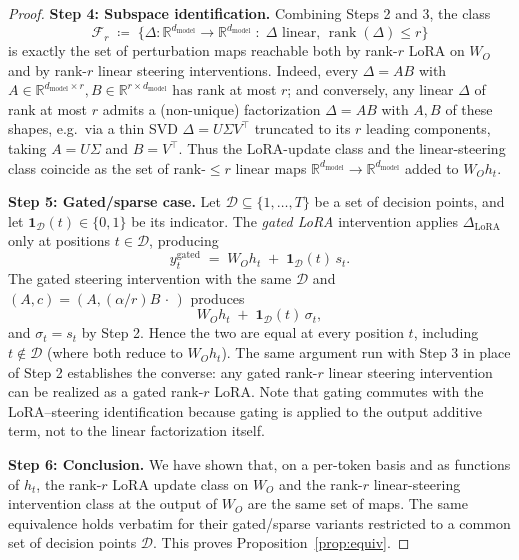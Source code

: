 \documentclass[11pt]{article}
\begin{document}
\begin{proof}
\smallskip

\noindent\textbf{Step 4: Subspace identification.}
Combining Steps 2 and 3, the class
\[
\mathcal{F}_r \;\coloneqq\; \bigl\{ \Delta : \mathbb{R}^{d_{\mathrm{model}}} \to \mathbb{R}^{d_{\mathrm{model}}} \;:\; \Delta \text{ linear, } \operatorname{rank}(\Delta) \le r \bigr\}
\]
is exactly the set of perturbation maps reachable both by rank-$r$ LoRA on $W_O$ and by rank-$r$ linear steering interventions. Indeed, every $\Delta = AB$ with $A \in \mathbb{R}^{d_{\mathrm{model}}\times r}, B \in \mathbb{R}^{r \times d_{\mathrm{model}}}$ has rank at most $r$; and conversely, any linear $\Delta$ of rank at most $r$ admits a (non-unique) factorization $\Delta = AB$ with $A, B$ of these shapes, e.g.\ via a thin SVD $\Delta = U \Sigma V^\top$ truncated to its $r$ leading components, taking $A = U\Sigma$ and $B = V^\top$. Thus the LoRA-update class and the linear-steering class coincide as the set of rank-$\le r$ linear maps $\mathbb{R}^{d_{\mathrm{model}}} \to \mathbb{R}^{d_{\mathrm{model}}}$ added to $W_O h_t$.

\smallskip

\noindent\textbf{Step 5: Gated/sparse case.}
Let $\mathcal{D} \subseteq \{1, \dots, T\}$ be a set of decision points, and let $\mathbf{1}_{\mathcal{D}}(t) \in \{0, 1\}$ be its indicator. The \emph{gated LoRA} intervention applies $\Delta_{\mathrm{LoRA}}$ only at positions $t \in \mathcal{D}$, producing
\[
y_t^{\mathrm{gated}} \;=\; W_O h_t \;+\; \mathbf{1}_{\mathcal{D}}(t)\, s_t.
\]
The gated steering intervention with the same $\mathcal{D}$ and $(A, c) = (A, (\alpha/r) B \,\cdot\,)$ produces
\[
W_O h_t \;+\; \mathbf{1}_{\mathcal{D}}(t)\, \sigma_t,
\]
and $\sigma_t = s_t$ by Step 2. Hence the two are equal at every position $t$, including $t \notin \mathcal{D}$ (where both reduce to $W_O h_t$). The same argument run with Step 3 in place of Step 2 establishes the converse: any gated rank-$r$ linear steering intervention can be realized as a gated rank-$r$ LoRA. Note that gating commutes with the LoRA--steering identification because gating is applied to the output additive term, not to the linear factorization itself.

\smallskip

\noindent\textbf{Step 6: Conclusion.}
We have shown that, on a per-token basis and as functions of $h_t$, the rank-$r$ LoRA update class on $W_O$ and the rank-$r$ linear-steering intervention class at the output of $W_O$ are the same set of maps. The same equivalence holds verbatim for their gated/sparse variants restricted to a common set of decision points $\mathcal{D}$. This proves Proposition~\ref{prop:equiv}.
\end{proof}
\end{document}
